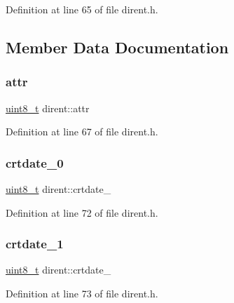 Definition at line 65 of file dirent.\+h.



\subsection{Member Data Documentation}
\mbox{\label{structdirent_a740c77a396a169bcba56d64b68d30715}} 
\subsubsection{\texorpdfstring{attr}{attr}}
{\footnotesize\ttfamily \mbox{\hyperlink{stdint_8h_aba7bc1797add20fe3efdf37ced1182c5}{uint8\+\_\+t}} dirent\+::attr}



Definition at line 67 of file dirent.\+h.

\mbox{\label{structdirent_a640fc8212e5728a781366f590c607e21}} 
\subsubsection{\texorpdfstring{crtdate\_0}{crtdate\_0}}
{\footnotesize\ttfamily \mbox{\hyperlink{stdint_8h_aba7bc1797add20fe3efdf37ced1182c5}{uint8\+\_\+t}} dirent\+::crtdate\+\_}



Definition at line 72 of file dirent.\+h.

\mbox{\label{structdirent_aac924b6ad7c5847c357416e32a864a54}} 
\subsubsection{\texorpdfstring{crtdate\_1}{crtdate\_1}}
{\footnotesize\ttfamily \mbox{\hyperlink{stdint_8h_aba7bc1797add20fe3efdf37ced1182c5}{uint8\+\_\+t}} dirent\+::crtdate\+\_}



Definition at line 73 of file dirent.\+h.

\mbox{\label{structdirent_a88d54669d58844277d63d00962f1bf6f}} 

